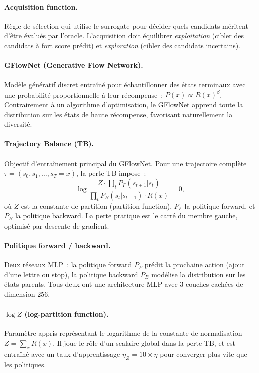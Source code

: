 \documentclass[10pt]{article}
\begin{document}
\paragraph{Acquisition function.}
Règle de sélection qui utilise le surrogate pour décider quels candidats méritent d'être évalués par l'oracle. L'acquisition doit équilibrer \emph{exploitation} (cibler des candidats à fort score prédit) et \emph{exploration} (cibler des candidats incertains).

\paragraph{GFlowNet (Generative Flow Network).}
Modèle génératif discret entraîné pour échantillonner des états terminaux avec une probabilité proportionnelle à leur récompense~: $P(x) \propto R(x)^{\beta}$. Contrairement à un algorithme d'optimisation, le GFlowNet apprend toute la distribution sur les états de haute récompense, favorisant naturellement la diversité.

\paragraph{Trajectory Balance (TB).}
Objectif d'entraînement principal du GFlowNet. Pour une trajectoire complète $\tau = (s_0, s_1, \ldots, s_T=x)$, la perte TB impose~:
\[
  \log \frac{Z \cdot \prod_{t} P_F(s_{t+1}|s_t)}{\prod_{t} P_B(s_t|s_{t+1}) \cdot R(x)} = 0,
\]
où $Z$ est la constante de partition (partition function), $P_F$ la politique forward, et $P_B$ la politique backward. La perte pratique est le carré du membre gauche, optimisé par descente de gradient.

\paragraph{Politique forward / backward.}
Deux réseaux MLP~: la politique forward $P_F$ prédit la prochaine action (ajout d'une lettre ou stop), la politique backward $P_B$ modélise la distribution sur les états parents. Tous deux ont une architecture MLP avec 3 couches cachées de dimension 256.

\paragraph{$\log Z$ (log-partition function).}
Paramètre appris représentant le logarithme de la constante de normalisation $Z = \sum_x R(x)$. Il joue le rôle d'un scalaire global dans la perte TB, et est entraîné avec un taux d'apprentissage $\eta_Z = 10 \times \eta$ pour converger plus vite que les politiques.
\end{document}
